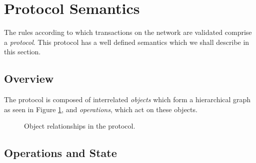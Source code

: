\section{Protocol Semantics}
\label{sec:protocol-semantics}


The rules according to which transactions on the \oscoin{} network are
validated comprise a \emph{protocol}. This protocol has a well defined semantics
which we shall describe in this section.

\subsection{Overview} The \oscoin{} protocol is composed of interrelated
\emph{objects} which form a hierarchical graph as seen in Figure
\ref{object-relationships}, and \emph{operations}, which act on these objects.

\medskip

\begin{figure}[htp]
\bigskip
\caption{Object relationships in the \oscoin{} protocol.
\label{object-relationships}}
\end{figure}

\subsection{Operations and State}
\label{operations-and-state}


